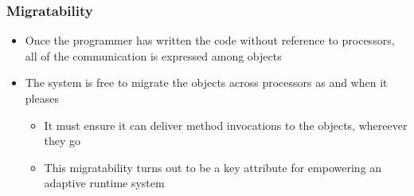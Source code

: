 
\begin{frame}[t]
\frametitle{Migratability}
  \begin{itemize}
    \item Once the programmer has written the code without reference to
        processors, all of the communication is expressed among objects
    \item The system is free to migrate the objects across processors as and when it pleases
      \begin{itemize}
        \item It must ensure it can deliver method invocations to the objects, whereever they go
        \item This migratability turns out to be a key attribute for empowering an adaptive runtime system
      \end{itemize}
  \end{itemize}
\end{frame}




